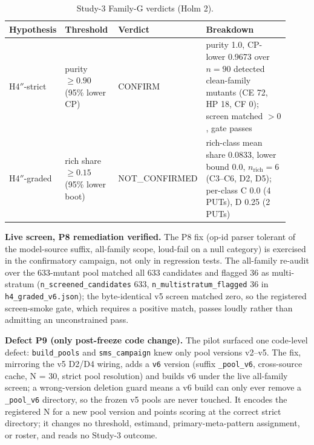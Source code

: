 \documentclass[manuscript,screen,review]{acmart}
\begin{document}
{%
\small
\begin{longtable}[]{@{}p{0.13\linewidth}p{0.20\linewidth}p{0.14\linewidth}p{0.45\linewidth}@{}}
\caption{Study-3 Family-G verdicts (Holm 2).}\label{tab:study3-verdicts}\\
\toprule\noalign{}
Hypothesis & Threshold & Verdict & Breakdown \\
\midrule\noalign{}
\endfirsthead
\endhead
\bottomrule\noalign{}
\endlastfoot
H4\('' \)-strict & purity $\geq 0.90$ (95\% lower CP) & CONFIRM & purity 1.0,
CP-lower 0.9673 over $n = 90$ detected clean-family mutants (CE 72, HP 18, CF 0);
screen matched $>0$, gate passes \\
H4\('' \)-graded & rich share $\geq 0.15$ (95\% lower boot) & NOT\_CONFIRMED &
rich-class mean share 0.0833, lower bound 0.0, $n_{\mathrm{rich}} = 6$
(C3--C6, D2, D5); per-class C 0.0 (4 PUTs), D 0.25 (2 PUTs) \\
\end{longtable}
\normalsize
}

\textbf{Live screen, P8 remediation verified.} The P8 fix (op-id parser
tolerant of the model-source suffix, all-family scope, loud-fail on a null
category) is exercised in the confirmatory campaign, not only in regression
tests. The all-family re-audit over the 633-mutant pool matched all 633
candidates and flagged 36 as multi-stratum
(\texttt{n\_screened\_candidates} 633, \texttt{n\_multistratum\_flagged} 36 in
\texttt{h4\_graded\_v6.json}); the byte-identical v5 screen matched zero, so the
registered screen-smoke gate, which requires a positive match, passes loudly
rather than admitting an unconstrained pass.

\textbf{Defect P9 (only post-freeze code change).} The pilot surfaced one
code-level defect: \texttt{build\_pools} and \texttt{sms\_campaign} knew only
pool versions v2--v5. The fix, mirroring the v5 D2/D4 wiring, adds a \texttt{v6}
version (suffix \texttt{\_pool\_v6}, cross-source cache, N = 30, strict pool
resolution) and builds v6 under the live all-family screen; a wrong-version
deletion guard means a v6 build can only ever remove a \texttt{\_pool\_v6}
directory, so the frozen v5 pools are never touched. It encodes the registered N
for a new pool version and points scoring at the correct strict directory; it
changes no threshold, estimand, primary-meta-pattern assignment, or roster, and
reads no Study-3 outcome.



\end{document}

